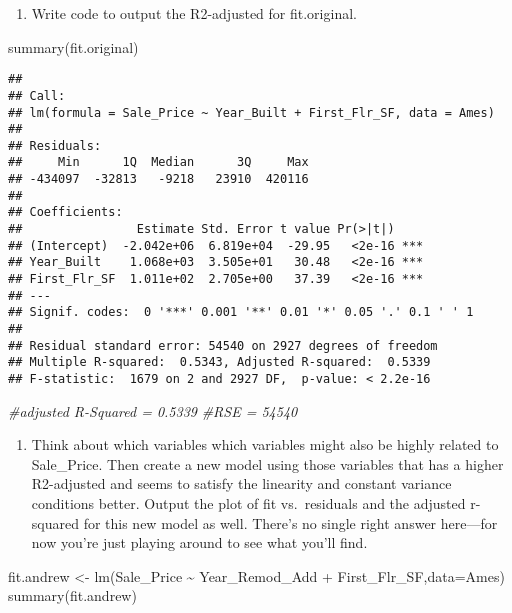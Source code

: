 \documentclass[
]{article}
\newenvironment{Shaded}{\begin{snugshade}}{\end{snugshade}}
\newcommand{\AttributeTok}[1]{\textcolor[rgb]{0.77,0.63,0.00}{#1}}
\newcommand{\CommentTok}[1]{\textcolor[rgb]{0.56,0.35,0.01}{\textit{#1}}}
\newcommand{\FunctionTok}[1]{\textcolor[rgb]{0.00,0.00,0.00}{#1}}
\newcommand{\NormalTok}[1]{#1}
\newcommand{\OtherTok}[1]{\textcolor[rgb]{0.56,0.35,0.01}{#1}}
\newcommand{\SpecialCharTok}[1]{\textcolor[rgb]{0.00,0.00,0.00}{#1}}
\providecommand{\tightlist}{%
  \setlength{\itemsep}{0pt}\setlength{\parskip}{0pt}}
\begin{document}
\begin{enumerate}
\def\labelenumi{\alph{enumi}.}
\setcounter{enumi}{1}
\tightlist
\item
  Write code to output the R2-adjusted for fit.original.
\end{enumerate}

\begin{Shaded}
\begin{Highlighting}[]
\FunctionTok{summary}\NormalTok{(fit.original)}
\end{Highlighting}
\end{Shaded}

\begin{verbatim}
## 
## Call:
## lm(formula = Sale_Price ~ Year_Built + First_Flr_SF, data = Ames)
## 
## Residuals:
##     Min      1Q  Median      3Q     Max 
## -434097  -32813   -9218   23910  420116 
## 
## Coefficients:
##                Estimate Std. Error t value Pr(>|t|)    
## (Intercept)  -2.042e+06  6.819e+04  -29.95   <2e-16 ***
## Year_Built    1.068e+03  3.505e+01   30.48   <2e-16 ***
## First_Flr_SF  1.011e+02  2.705e+00   37.39   <2e-16 ***
## ---
## Signif. codes:  0 '***' 0.001 '**' 0.01 '*' 0.05 '.' 0.1 ' ' 1
## 
## Residual standard error: 54540 on 2927 degrees of freedom
## Multiple R-squared:  0.5343, Adjusted R-squared:  0.5339 
## F-statistic:  1679 on 2 and 2927 DF,  p-value: < 2.2e-16
\end{verbatim}

\begin{Shaded}
\begin{Highlighting}[]
\CommentTok{\#adjusted R{-}Squared = 0.5339}
\CommentTok{\#RSE = 54540}
\end{Highlighting}
\end{Shaded}

\begin{enumerate}
\def\labelenumi{\alph{enumi}.}
\setcounter{enumi}{2}
\tightlist
\item
  Think about which variables which variables might also be highly
  related to Sale\_Price. Then create a new model using those variables
  that has a higher R2-adjusted and seems to satisfy the linearity and
  constant variance conditions better. Output the plot of fit
  vs.~residuals and the adjusted r-squared for this new model as well.
  There's no single right answer here---for now you're just playing
  around to see what you'll find.
\end{enumerate}

\begin{Shaded}
\begin{Highlighting}[]
\NormalTok{fit.andrew }\OtherTok{\textless{}{-}} \FunctionTok{lm}\NormalTok{(Sale\_Price }\SpecialCharTok{\textasciitilde{}}\NormalTok{ Year\_Remod\_Add }\SpecialCharTok{+}\NormalTok{ First\_Flr\_SF,}\AttributeTok{data=}\NormalTok{Ames)}
\FunctionTok{summary}\NormalTok{(fit.andrew)}
\end{Highlighting}
\end{Shaded}
\end{document}
